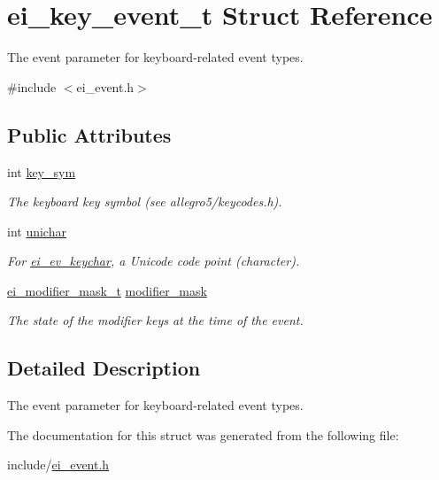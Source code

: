\hypertarget{structei__key__event__t}{}\section{ei\+\_\+key\+\_\+event\+\_\+t Struct Reference}
\label{structei__key__event__t}


The event parameter for keyboard-\/related event types.  




{\ttfamily \#include $<$ei\+\_\+event.\+h$>$}

\subsection*{Public Attributes}
\begin{DoxyCompactItemize}
\item 
int \hyperlink{structei__key__event__t_a55a3611e3a15b95b21be4218f7fa6f3d}{key\+\_\+sym}\hypertarget{structei__key__event__t_a55a3611e3a15b95b21be4218f7fa6f3d}{}\label{structei__key__event__t_a55a3611e3a15b95b21be4218f7fa6f3d}

\begin{DoxyCompactList}\small\item\em The keyboard key symbol (see allegro5/keycodes.\+h). \end{DoxyCompactList}\item 
int \hyperlink{structei__key__event__t_a85ecd793d10f4314b1ac8f2f46c52c88}{unichar}\hypertarget{structei__key__event__t_a85ecd793d10f4314b1ac8f2f46c52c88}{}\label{structei__key__event__t_a85ecd793d10f4314b1ac8f2f46c52c88}

\begin{DoxyCompactList}\small\item\em For \hyperlink{ei__event_8h_a132dde064150d861ad24e9d839cbe007a65746b5440ecd78bceecfaad7ee107ad}{ei\+\_\+ev\+\_\+keychar}, a Unicode code point (character). \end{DoxyCompactList}\item 
\hyperlink{ei__event_8h_abcdd2ef0f39179463f17a06be9bdf949}{ei\+\_\+modifier\+\_\+mask\+\_\+t} \hyperlink{structei__key__event__t_a35e4dc6d788b9fdd4eeedf716662afab}{modifier\+\_\+mask}\hypertarget{structei__key__event__t_a35e4dc6d788b9fdd4eeedf716662afab}{}\label{structei__key__event__t_a35e4dc6d788b9fdd4eeedf716662afab}

\begin{DoxyCompactList}\small\item\em The state of the modifier keys at the time of the event. \end{DoxyCompactList}\end{DoxyCompactItemize}


\subsection{Detailed Description}
The event parameter for keyboard-\/related event types. 

The documentation for this struct was generated from the following file\+:\begin{DoxyCompactItemize}
\item 
include/\hyperlink{ei__event_8h}{ei\+\_\+event.\+h}\end{DoxyCompactItemize}

